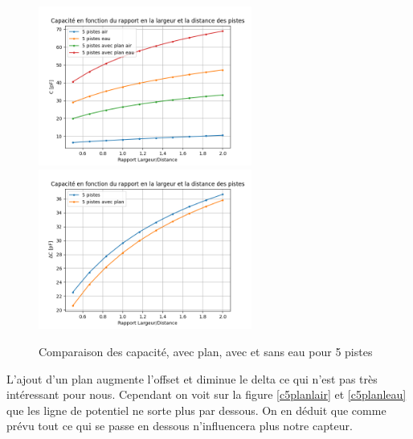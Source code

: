 \begin{figure}[!ht]
 \centering
 \includegraphics[width=7cm]{C5masseGraph1.png}
 \includegraphics[width=7cm]{C5masseGraph2.png}
 \caption{Comparaison des capacité, avec plan, avec et sans eau pour 5 pistes}
\end{figure}

L'ajout d'un plan augmente l'offset et diminue le delta ce qui n'est pas très intéressant pour nous. Cependant on voit sur la figure \ref{c5planlair} et \ref{c5planleau} que les ligne de potentiel ne sorte plus par dessous. On en déduit que comme prévu tout ce qui se passe en dessous n’influencera plus notre capteur.
